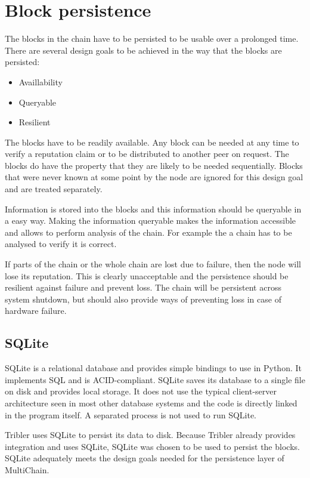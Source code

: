 \section{Block persistence}
The blocks in the chain have to be persisted to be usable over a prolonged time.
There are several design goals to be achieved in the way that the blocks are persisted:
\begin{itemize}
    \item Availlability
    \item Queryable
    \item Resilient
\end{itemize}

The blocks have to be readily available.
Any block can be needed at any time to verify a reputation claim
or to be distributed to another peer on request.
The blocks do have the property that they are likely to be needed sequentially.
Blocks that were never known at some point by the node are ignored for this design goal
and are treated separately.

Information is stored into the blocks and this information should be queryable in a easy way.
Making the information queryable makes the information accessible
and allows to perform analysis of the chain.
For example the a chain has to be analysed to verify it is correct.

If parts of the chain or the whole chain are lost due to failure,
then the node will lose its reputation.
This is clearly unacceptable and the persistence should be resilient against failure
and prevent loss.
The chain will be persistent across system shutdown,
but should also provide ways of preventing loss in case of hardware failure.

\subsection{SQLite}
SQLite is a relational database and provides simple bindings to use in Python\cite{owens-sqlite}.
It implements SQL and is ACID-compliant\cite{haerder-ACID}.
SQLite saves its database to a single file on disk and provides local storage.
It does not use the typical client-server architecture seen in most other database systems
and the code is directly linked in the program itself.
A separated process is not used to run SQLite.

Tribler uses SQLite to persist its data to disk.
Because Tribler already provides integration and uses SQLite,
SQLite was chosen to be used to persist the blocks.
SQLite adequately meets the design goals needed for the persistence layer of MultiChain.

